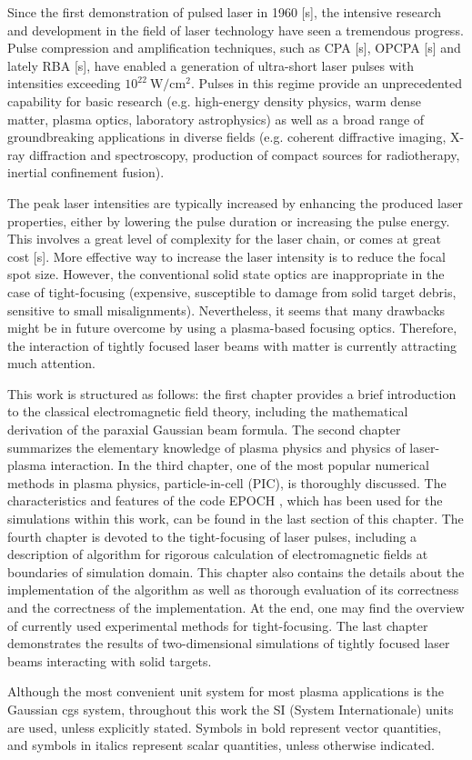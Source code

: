 Since the first demonstration of pulsed laser in 1960 [s], the intensive research and development in the field of laser technology have seen a tremendous progress. Pulse compression and amplification techniques, such as CPA [s], OPCPA [s] and lately RBA [s], have enabled a generation of ultra-short laser pulses with intensities exceeding $ 10^{22} \ \mathrm{W/cm^{2}} $. Pulses in this regime provide an unprecedented capability for basic research (e.g. high-energy density physics, warm dense matter, plasma optics, laboratory astrophysics) as well as a broad range of groundbreaking applications in diverse fields (e.g. coherent diffractive imaging, X-ray diffraction and spectroscopy, production of compact sources for radiotherapy, inertial confinement fusion).

The peak laser intensities are typically increased by enhancing the produced laser properties, either by lowering the pulse duration or increasing the pulse energy. This involves a great level of complexity for the laser chain, or comes at great cost [s]. More effective way to increase the laser intensity is to reduce the focal spot size. However, the conventional solid state optics are inappropriate in the case of tight-focusing (expensive, susceptible to damage from solid target debris, sensitive to small misalignments). Nevertheless, it seems that many drawbacks might be in future overcome by using a plasma-based focusing optics. Therefore, the interaction of tightly focused laser beams with matter is currently attracting much attention. 

This work is structured as follows: the first chapter provides a brief introduction to the classical electromagnetic field theory, including the mathematical derivation of the paraxial Gaussian beam formula. The second chapter summarizes the elementary knowledge of plasma physics and physics of laser-plasma interaction. In the third chapter, one of the most popular numerical methods in plasma physics, particle-in-cell (PIC), is thoroughly discussed. The characteristics and features of the code EPOCH \cite{bennett}, which has been used for the simulations within this work, can be found in the last section of this chapter. The fourth chapter is devoted to the tight-focusing of laser pulses, including a description of algorithm for rigorous calculation of electromagnetic fields at boundaries of simulation domain. This chapter also contains the details about the implementation of the algorithm as well as thorough evaluation of its correctness and the correctness of the implementation. At the end, one may find the overview of currently used experimental methods for tight-focusing. The last chapter demonstrates the results of two-dimensional simulations of tightly focused laser beams interacting with solid targets.

Although the most convenient unit system for most plasma applications is the Gaussian cgs system, throughout this work the SI (System Internationale) units are used, unless explicitly stated. Symbols in bold represent vector quantities, and symbols in italics represent scalar quantities, unless otherwise indicated.
